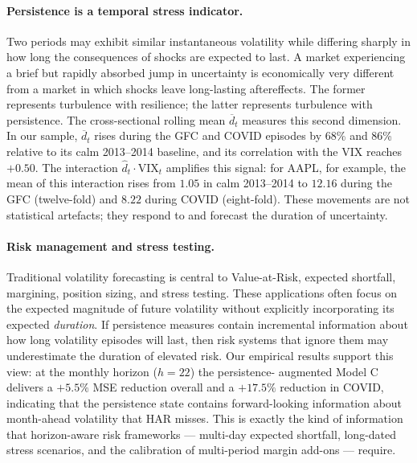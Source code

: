 \documentclass[11pt,a4paper]{article}
\newcommand{\VIX}{\mathrm{VIX}}
\newcommand{\dhat}{\hat d}
\begin{document}
\paragraph{Persistence is a temporal stress indicator.}
Two periods may exhibit similar instantaneous volatility while differing
sharply in how long the consequences of shocks are expected to last. A
market experiencing a brief but rapidly absorbed jump in uncertainty is
economically very different from a market in which shocks leave
long-lasting aftereffects. The former represents turbulence with
resilience; the latter represents turbulence with persistence. The
cross-sectional rolling mean $\overline d_t$ measures this second
dimension. In our sample, $\overline d_t$ rises during the GFC and COVID
episodes by 68\% and 86\% relative to its calm 2013--2014 baseline, and
its correlation with the VIX reaches $+0.50$. The interaction
$\dhat_t\!\cdot\!\VIX_t$ amplifies this signal: for AAPL, for example,
the mean of this interaction rises from $1.05$ in calm 2013--2014 to
$12.16$ during the GFC (twelve-fold) and $8.22$ during COVID
(eight-fold). These movements are not statistical artefacts; they
respond to and forecast the duration of uncertainty.

\paragraph{Risk management and stress testing.}
Traditional volatility forecasting is central to Value-at-Risk, expected
shortfall, margining, position sizing, and stress testing. These
applications often focus on the expected magnitude of future volatility
without explicitly incorporating its expected \emph{duration}. If
persistence measures contain incremental information about how long
volatility episodes will last, then risk systems that ignore them may
underestimate the duration of elevated risk. Our empirical results
support this view: at the monthly horizon ($h=22$) the persistence-
augmented Model C delivers a $+5.5\%$ MSE reduction overall and a
$+17.5\%$ reduction in COVID, indicating that the persistence state
contains forward-looking information about month-ahead volatility that
HAR misses. This is exactly the kind of information that horizon-aware
risk frameworks --- multi-day expected shortfall, long-dated stress
scenarios, and the calibration of multi-period margin add-ons ---
require.
\end{document}
